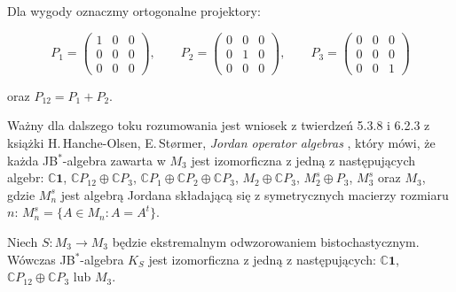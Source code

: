 {Dla wygody oznaczmy ortogonalne projektory:
\begin{linenomath*}
 \begin{equation}
\label{def:OrthogonalProjections}
    P_{1} = \begin{pmatrix}
        1 & 0 & 0 \\
        0 & 0 & 0 \\
        0 & 0 & 0
    \end{pmatrix} , \quad \quad
    P_{2} = \begin{pmatrix}
        0 & 0 & 0 \\
        0 & 1 & 0 \\
        0 & 0 & 0
    \end{pmatrix} , \quad \quad
    P_{3} = \begin{pmatrix}
        0 & 0 & 0 \\
        0 & 0 & 0 \\
        0 & 0 & 1
    \end{pmatrix}
 \end{equation}
\end{linenomath*}
oraz $P_{12} = P_{1} + P_{2}$.

\label{page:allpossibleJalg}
Ważny dla dalszego toku rozumowania jest wniosek z twierdzeń 5.3.8 i 6.2.3
z książki
H.\,Hanche-Olsen, E.\,St{\o}rmer,
\emph{Jordan operator algebras} \cite{Hanche1984},
który mówi, że każda JB$^{*}$-algebra zawarta w $M_{3}$
jest izomorficzna z jedną z następujących algebr:
$\mathbb{C}\mathbf{1}$,
$\mathbb{C} P_{12} \oplus \mathbb{C} P_{3}$,
$\mathbb{C} P_{1} \oplus \mathbb{C} P_{2} \oplus \mathbb{C} P_{3}$,
$M_{2} \oplus \mathbb{C} P_{3}$,
$M_{2}^{s} \oplus P_{3}$,
$M_{3}^{s}$ oraz $M_{3}$,
gdzie $M_{n}^{s}$ jest algebrą Jordana składającą się z symetrycznych
macierzy rozmiaru $n$: $M_{n}^{s} = \{ A \in M_{n}: A = A^{t} \}$.

\begin{Theorem}
\label{thm:ExposedMaps}
Niech $S\!: M_{3} \rightarrow M_{3}$ będzie ekstremalnym odwzorowaniem
bistochastycznym.
Wówczas JB$^{*}$-algebra $K_{S}$ jest izomorficzna z jedną z następujących:
$\mathbb{C}\mathbf{1}$, $\mathbb{C} P_{12} \oplus \mathbb{C} P_{3}$
lub
$M_{3}$.
\end{Theorem}

}
